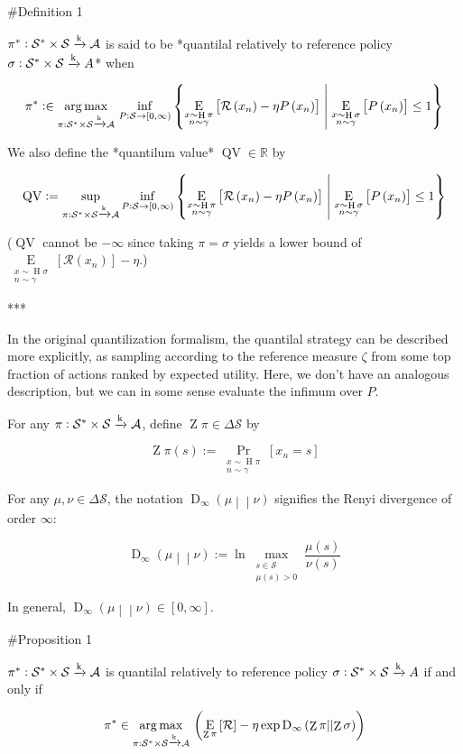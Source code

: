 \documentclass[a4paper]{article}
\newcommand{\AP}[1]{\left(#1\right)}
\newcommand{\AB}[1]{\left[#1\right]}
\newcommand{\ACM}[2]{\left\{#1\;\middle\vert\;#2\right\}}
\newcommand{\Pa}[2]{\underset{#1}{\operatorname{Pr}}\AB{#2}}
\newcommand{\Ea}[2]{\underset{#1}{\operatorname{E}}\AB{#2}}
\newcommand{\RD}[3]{\operatorname{D}_{#1}\AP{#2\middle\vert\middle\vert#3}}
\newcommand{\Argmax}[1]{\underset{#1}{\operatorname{arg\,max}}\,}
\newcommand{\Reals}{\mathbb{R}}
\newcommand{\K}{\xrightarrow{\textnormal{k}}}
\newcommand{\A}{\mathcal{A}}
\newcommand{\St}{\mathcal{S}}
\newcommand{\R}{\mathcal{R}}
\newcommand{\Pe}{P}
\newcommand{\QV}{\operatorname{QV}}
\DeclareMathOperator{\Hi}{H}
\DeclareMathOperator{\Z}{Z}
\begin{document}
\#Definition 1

$\pi^* : \St^*\times\St \K \A$ is said to be *quantilal relatively to reference policy $\sigma: \St^*\times\St \K A$* when

$$\pi^* :\in \Argmax{\pi: \St^*\times\St \K \A}\inf_{\Pe:\St\rightarrow[0,\infty)}\ACM{\Ea{\substack{x\sim\Hi{\pi}\\n\sim\gamma}}{\R\AP{x_n}-\eta\Pe\AP{x_n}}}{\Ea{\substack{x\sim\Hi{\sigma}\\n\sim\gamma}}{\Pe\AP{x_n}}\leq1}$$

We also define the *quantilum value* $\QV \in \Reals$ by

$$\QV := \sup_{\pi: \St^*\times\St \K \A}\inf_{\Pe:\St\rightarrow[0,\infty)}\ACM{\Ea{\substack{x\sim\Hi{\pi}\\n\sim\gamma}}{\R\AP{x_n}-\eta\Pe\AP{x_n}}}{\Ea{\substack{x\sim\Hi{\sigma}\\n\sim\gamma}}{\Pe\AP{x_n}}\leq1}$$

($\QV$ cannot be $-\infty$ since taking $\pi=\sigma$ yields a lower bound of $\Ea{\substack{x\sim\Hi{\sigma}\\n\sim\gamma}}{\R\AP{x_n}}-\eta$.)

***

In the original quantilization formalism, the quantilal strategy can be described more explicitly, as sampling according to the reference measure $\zeta$ from some top fraction of actions ranked by expected utility. Here, we don't have an analogous description, but we can in some sense evaluate the infimum over $\Pe$.

For any $\pi: \St^*\times\St \K \A$, define $\Z{\pi}\in\Delta\St$ by

$$\Z{\pi}(s):=\Pa{\substack{x\sim\Hi{\pi}\\n\sim\gamma}}{x_n=s}$$

For any $\mu,\nu\in\Delta\St$, the notation $\RD{\infty}{\mu}{\nu}$ signifies the Renyi divergence of order $\infty$:

$$\RD{\infty}{\mu}{\nu} := \ln \max_{\substack{s\in\St \\ \mu(s)> 0}}\frac{\mu(s)}{\nu(s)}$$

In general, $\RD{\infty}{\mu}{\nu} \in [0,\infty]$. 

\#Proposition 1

$\pi^* : \St^*\times\St \K \A$ is quantilal relatively to reference policy $\sigma: \St^*\times\St \K A$ if and only if

$$\pi^* \in \Argmax{\pi: \St^*\times\St \K \A}\AP{\Ea{\Z{\pi}}{\R}-\eta \exp{\RD{\infty}{\Z{\pi}}{\Z{\sigma}}}}$$
\end{document}
